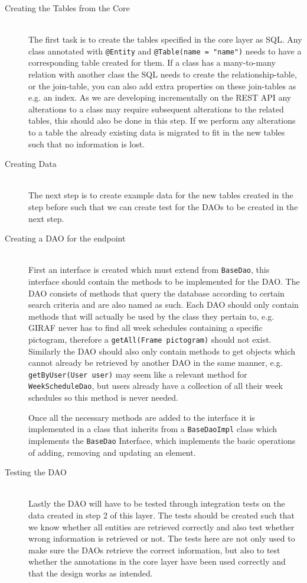 \begin{description}
	\item[Creating the Tables from the Core] \hfill \\
	The first task is to create the tables specified in the core layer as SQL.
	Any class annotated with \texttt{@Entity} and \texttt{@Table(name = "name")} needs to have a corresponding table created for them.
	If a class has a many-to-many relation with another class the SQL needs to create the relationship-table, or the join-table, you can also add extra properties on these join-tables as e.g. an index.
	As we are developing incrementally on the REST API any alterations to a class may require subsequent alterations to the related tables, this should also be done in this step.
	If we perform any alterations to a table the already existing data is migrated to fit in the new tables such that no information is lost.
	\item[Creating Data] \hfill \\
	The next step is to create example data for the new tables created in the step before such that we can create test for the DAOs to be created in the next step.
	\item[Creating a DAO for the endpoint] \hfill \\
	First an interface is created which must extend from \texttt{BaseDao}, this interface should contain the methods to be implemented for the DAO.
	The DAO consists of methods that query the database according to certain search criteria and are also named as such.
	Each DAO should only contain methods that will actually be used by the class they pertain to, e.g. GIRAF never has to find all week schedules containing a specific pictogram, therefore a \texttt{getAll(Frame pictogram)} should not exist.
	Similarly the DAO should also only contain methods to get objects which cannot already be retrieved by another DAO in the same manner,	e.g. \texttt{getByUser(User user)} may seem like a relevant method for \texttt{WeekScheduleDao}, but users already have a collection of all their week schedules so this method is never needed.

	Once all the necessary methods are added to the interface it is implemented in a class that inherits from a \texttt{BaseDaoImpl} class which implements the \texttt{BaseDao} Interface, which implements the basic operations of adding, removing and updating an element.
	\item[Testing the DAO] \hfill \\
	Lastly the DAO will have to be tested through integration tests on the data created in step 2 of this layer.
	The tests should be created such that we know whether all entities are retrieved correctly and also test whether wrong information is retrieved or not.
	The tests here are not only used to make sure the DAOs retrieve the correct information, but also to test whether the annotations in the core layer have been used correctly and that the design works as intended.
\end{description}

